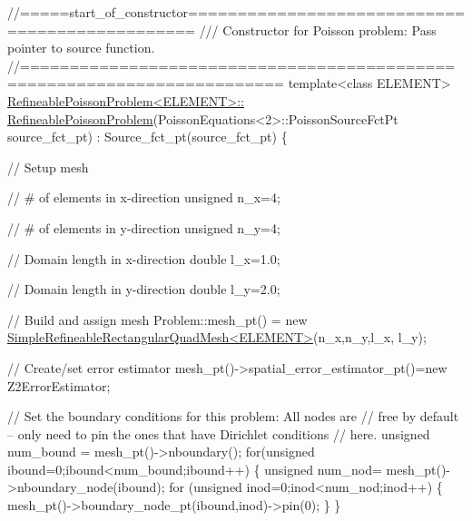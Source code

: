 \begin{DoxyCodeInclude}
\textcolor{comment}{//=====start\_of\_constructor===============================================}
\textcolor{comment}{/// Constructor for Poisson problem: Pass pointer to source function.}
\textcolor{comment}{}\textcolor{comment}{//========================================================================}
\textcolor{keyword}{template}<\textcolor{keyword}{class} ELEMENT>
\hyperlink{classRefineablePoissonProblem_a019ec586c38163e04e177de92503c02f}{RefineablePoissonProblem<ELEMENT>::}
\hyperlink{classRefineablePoissonProblem_a019ec586c38163e04e177de92503c02f}{      RefineablePoissonProblem}(PoissonEquations<2>::PoissonSourceFctPt 
                               source\_fct\_pt)
       :  Source\_fct\_pt(source\_fct\_pt)
\{ 

 \textcolor{comment}{// Setup mesh}

 \textcolor{comment}{// # of elements in x-direction}
 \textcolor{keywordtype}{unsigned} n\_x=4;

 \textcolor{comment}{// # of elements in y-direction}
 \textcolor{keywordtype}{unsigned} n\_y=4;

 \textcolor{comment}{// Domain length in x-direction}
 \textcolor{keywordtype}{double} l\_x=1.0;

 \textcolor{comment}{// Domain length in y-direction}
 \textcolor{keywordtype}{double} l\_y=2.0;

 \textcolor{comment}{// Build and assign mesh}
 Problem::mesh\_pt() = 
  \textcolor{keyword}{new} \hyperlink{classSimpleRefineableRectangularQuadMesh}{SimpleRefineableRectangularQuadMesh<ELEMENT>}(n\_x,n\_y,l\_x,
      l\_y);

 \textcolor{comment}{// Create/set error estimator}
 mesh\_pt()->spatial\_error\_estimator\_pt()=\textcolor{keyword}{new} Z2ErrorEstimator;
  
 \textcolor{comment}{// Set the boundary conditions for this problem: All nodes are}
 \textcolor{comment}{// free by default -- only need to pin the ones that have Dirichlet conditions}
 \textcolor{comment}{// here. }
 \textcolor{keywordtype}{unsigned} num\_bound = mesh\_pt()->nboundary();
 \textcolor{keywordflow}{for}(\textcolor{keywordtype}{unsigned} ibound=0;ibound<num\_bound;ibound++)
  \{
   \textcolor{keywordtype}{unsigned} num\_nod= mesh\_pt()->nboundary\_node(ibound);
   \textcolor{keywordflow}{for} (\textcolor{keywordtype}{unsigned} inod=0;inod<num\_nod;inod++)
    \{
     mesh\_pt()->boundary\_node\_pt(ibound,inod)->pin(0); 
    \}
  \}


\end{DoxyCodeInclude}

